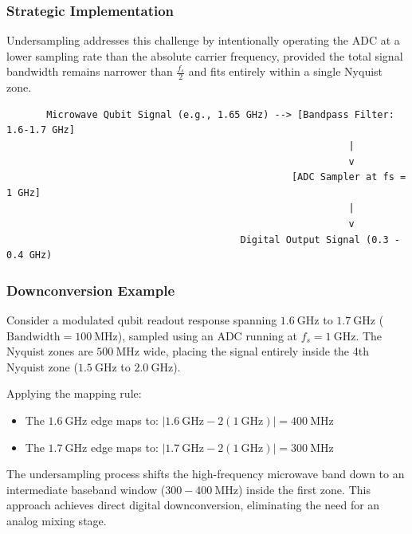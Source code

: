 \documentclass[
]{article}
\providecommand{\tightlist}{%
  \setlength{\itemsep}{0pt}\setlength{\parskip}{0pt}}
\begin{document}
\subsubsection{Strategic Implementation}\label{strategic-implementation}

Undersampling addresses this challenge by intentionally operating the
ADC at a lower sampling rate than the absolute carrier frequency,
provided the total signal bandwidth remains narrower than
\(\frac{f_s}{2}\) and fits entirely within a single Nyquist zone.

\begin{verbatim}
       Microwave Qubit Signal (e.g., 1.65 GHz) --> [Bandpass Filter: 1.6-1.7 GHz]
                                                            |
                                                            v
                                                  [ADC Sampler at fs = 1 GHz]
                                                            |
                                                            v
                                         Digital Output Signal (0.3 - 0.4 GHz)
\end{verbatim}

\subsubsection{Downconversion Example}\label{downconversion-example}

Consider a modulated qubit readout response spanning \(1.6\ \text{GHz}\)
to \(1.7\ \text{GHz}\) (\(\text{Bandwidth} = 100\ \text{MHz}\)), sampled
using an ADC running at \(f_s = 1\ \text{GHz}\). The Nyquist zones are
\(500\ \text{MHz}\) wide, placing the signal entirely inside the 4th
Nyquist zone (\(1.5\ \text{GHz}\) to \(2.0\ \text{GHz}\)).

Applying the mapping rule:

\begin{itemize}
\tightlist
\item
  The \(1.6\ \text{GHz}\) edge maps to:
  \(|1.6\ \text{GHz} - 2(1\ \text{GHz})| = 400\ \text{MHz}\)
\item
  The \(1.7\ \text{GHz}\) edge maps to:
  \(|1.7\ \text{GHz} - 2(1\ \text{GHz})| = 300\ \text{MHz}\)
\end{itemize}

The undersampling process shifts the high-frequency microwave band down
to an intermediate baseband window (\(300 - 400\ \text{MHz}\)) inside
the first zone. This approach achieves direct digital downconversion,
eliminating the need for an analog mixing stage.
\end{document}
